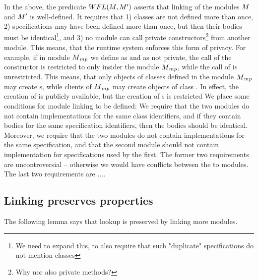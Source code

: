  
 
{In the above, the predicate $WFL(M,M{'})$ asserts that linking of the modules $M$ and $M{'}$ is well-defined. It requires that 1) classes are not defined more than once, 2) specifications may have been defined more than once, but then their bodies must be identical\footnote{We need to expand this, to also require that such "duplicate" specifications do not mention classes}, and 3) no module can call private constructors\footnote{Why nor also private methods?} from another module. This means, that the runtime system enforces this form of privacy.   For example, if in module $M{_{mp}}$ we define  as  and  as not private,
the call of the  constructor is restricted to only insider the module $M{_{mp}}$, while the call of  is unrestricted.
This means, that only objects of classes defined in the module  $M{_{mp}}$ may create s, while  clients of $M{_{mp}}$ may create
objects of class . In effect, the creation of  is publicly available, but the creation of  s is restricted}
We place some conditions for module linking to be defined: We require that the two modules do not contain implementations for the same class identifiers, and if they contain bodies for the same specification identifiers, then the bodies should be identical. Moreover, we require that the two modules do not contain implementations for the same specification, and that the second module should not contain implementation for specifications used by the first. The former two requirements are uncontroversial -- otherwise we would have conflicts between the to modules. The last two requirements are 
....


\subsection{Linking preserves properties}

{The following lemma says that lookup is preserved by linking more modules.}

